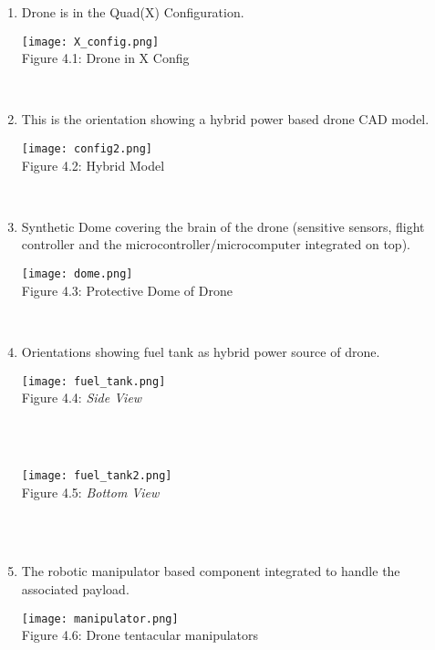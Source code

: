 \documentclass[conference]{IEEEtran}
\begin{document}
\begin{enumerate}
    \item Drone is in the Quad(X) Configuration.\\
    
    \graphicspath{ {./images/} }
    \texttt{[image: X\_config.png]}\\
    \caption{Figure 4.1: Drone in X Config}\\

    \item This is the orientation showing a hybrid power based drone CAD model. \\

    \graphicspath{ {./images/} }
    \texttt{[image: config2.png]}\\
    \caption{Figure 4.2: Hybrid Model}\\

    \item Synthetic Dome covering the brain of the drone (sensitive sensors, flight controller and the microcontroller/microcomputer integrated on top).\\

    \graphicspath{ {./images/} }
    \texttt{[image: dome.png]}\\
    \caption{Figure 4.3: Protective Dome of Drone}\\
    
    \item Orientations showing fuel tank as hybrid power source of drone.\\

    \graphicspath{ {./images/} }
    \texttt{[image: fuel\_tank.png]}\\
    \caption{Figure 4.4: \textit{Side View}}\\\\


    \graphicspath{ {./images/} }
    \texttt{[image: fuel\_tank2.png]}\\
    \caption{Figure 4.5: \textit{Bottom View}}\\\\

    \item The robotic manipulator based component integrated to handle the associated payload.\\

    \graphicspath{ {./images/} }
    \texttt{[image: manipulator.png]}\\
    \caption{Figure 4.6: Drone tentacular manipulators}\\
    
    
\end{enumerate}
\end{document}

